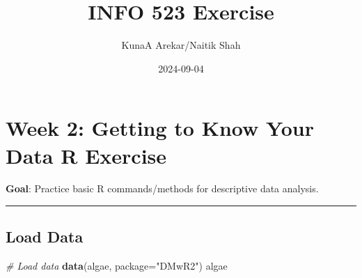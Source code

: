\documentclass[
]{article}
\title{INFO 523 Exercise}
\author{KunaA Arekar/Naitik Shah}
\date{2024-09-04}
\newenvironment{Shaded}{\begin{snugshade}}{\end{snugshade}}
\newcommand{\AttributeTok}[1]{\textcolor[rgb]{0.13,0.29,0.53}{#1}}
\newcommand{\CommentTok}[1]{\textcolor[rgb]{0.56,0.35,0.01}{\textit{#1}}}
\newcommand{\FunctionTok}[1]{\textcolor[rgb]{0.13,0.29,0.53}{\textbf{#1}}}
\newcommand{\NormalTok}[1]{#1}
\newcommand{\StringTok}[1]{\textcolor[rgb]{0.31,0.60,0.02}{#1}}
\begin{document}
\maketitle

\section{Week 2: Getting to Know Your Data R
Exercise}\label{week-2-getting-to-know-your-data-r-exercise}

\textbf{Goal}: Practice basic R commands/methods for descriptive data
analysis.

\begin{center}\rule{0.5\linewidth}{0.5pt}\end{center}

\subsection{Load Data}\label{load-data}

\begin{Shaded}
\begin{Highlighting}[]
\CommentTok{\# Load data}
\FunctionTok{data}\NormalTok{(algae, }\AttributeTok{package=}\StringTok{"DMwR2"}\NormalTok{)}
\NormalTok{algae}
\end{Highlighting}
\end{Shaded}
\end{document}
